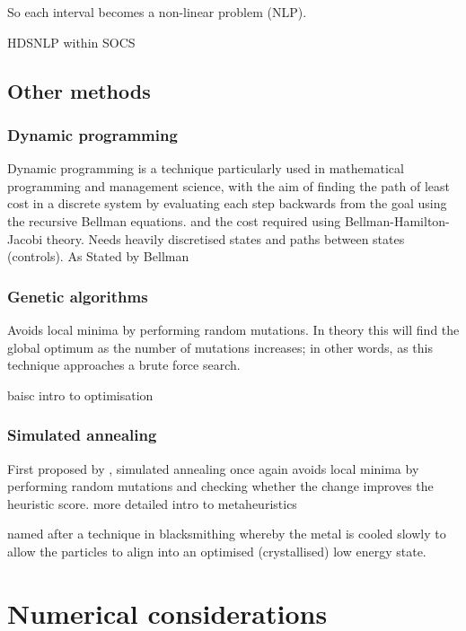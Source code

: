 So each interval becomes a non-linear problem (NLP).

HDSNLP within SOCS

\subsection{Other methods}

\subsubsection{Dynamic programming}

Dynamic programming is a technique particularly used in mathematical programming and management science, with the aim of finding the path of least cost in a discrete system by evaluating each step backwards from the goal using the recursive Bellman equations. and the cost required using Bellman-Hamilton-Jacobi theory. Needs heavily discretised states and paths between states (controls). As Stated by Bellman

\subsubsection{Genetic algorithms}

Avoids local minima by performing random mutations. In theory this will find the global optimum as the number of mutations increases; in other words, as this technique approaches a brute force search.

\textcite{Nocedal2006} baisc intro to optimisation

\subsubsection{Simulated annealing}

First proposed by \textcite{Kirkpatrick1983}, simulated annealing once again avoids local minima by performing random mutations and checking whether the change improves the heuristic score.
\textcite{Dreo2006} more detailed intro to metaheuristics

named after a technique in blacksmithing whereby the metal is cooled slowly to allow the particles to align into an optimised (crystallised) low energy state.



\section{Numerical considerations} \label{sec:Numerical-considerations}

